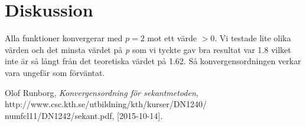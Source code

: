 \documentclass[titlepage, a4paper]{article}
\begin{document}
\section{Diskussion}
 Alla funktioner konvergerar med $p=2$ mot ett värde $>$0. Vi testade lite olika värden och det minsta värdet på \textit{p} som vi tyckte gav bra resultat var 1.8 vilket inte är så långt från det teoretiska värdet på 1.62. Så konvergensordningen verkar vara ungefär som förväntat.

\begin{thebibliography}{9}

  Olof Runborg,
  \emph{Konvergensordning för sekantmetoden},
  http://www.csc.kth.se/utbildning/kth/kurser/DN1240/
  numfcl11/DN1242/sekant.pdf,
  [2015-10-14].

\end{thebibliography}
\end{document}
